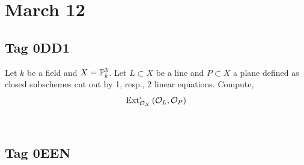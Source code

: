 \documentclass[12pt]{article}
\begin{document}
\section{March 12}

\subsection{Tag 0DD1}

\begin{exr}
Let $k$ be a field and $X = \P_k^3$. Let $L \subset X$ be a line and $P \subset X$ a plane defined as closed subschemes cut out by 1, resp., 2 linear equations. Compute,
\[ \Ext{i}{\struct{X}}{\struct{L}}{\struct{P}} \]
\end{exr}
\noindent\\


\subsection{Tag 0EEN}
\end{document}
